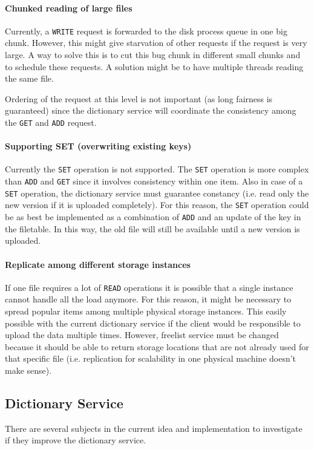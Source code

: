 \documentclass[12pt,a4paper]{scrartcl}
\begin{document}
\paragraph{Chunked reading of large files}
Currently, a \verb|WRITE| request is forwarded to the disk process queue in one big chunk. However, this might give starvation of other requests if the request is very large. A way to solve this is to cut this bug chunk in different small chunks and to schedule these requests. A solution might be to have multiple threads reading the same file. 

Ordering of the request at this level is not important (as long fairness is guaranteed) since the dictionary service will coordinate the consistency among the \verb|GET| and \verb|ADD| request.

\paragraph{Supporting SET (overwriting existing keys)}
Currently the \verb|SET| operation is not supported. The \verb|SET| operation is more complex than \verb|ADD| and \verb|GET| since it involves consistency within one item. Also in case of a \verb|SET| operation, the dictionary service must guarantee constancy (i.e. read only the new version if it is uploaded completely). For this reason, the \verb|SET| operation could be as best be implemented as a combination of \verb|ADD| and an update of the key in the filetable. In this way, the old file will still be available until a new version is uploaded.

\paragraph{Replicate among different storage instances}
If one file requires a lot of \verb|READ| operations it is possible that a single instance cannot handle all the load anymore. For this reason, it might be necessary to spread popular items among multiple physical storage instances. This easily possible with the current dictionary service if the client would be responsible to upload the data multiple times. However, freelist service must be changed because it should be able to return storage locations that are not already used for that specific file (i.e. replication for scalability in one physical machine doesn't make sense).

\subsection{Dictionary Service}
There are several subjects in the current idea and implementation to investigate if they improve the dictionary service.
\end{document}
